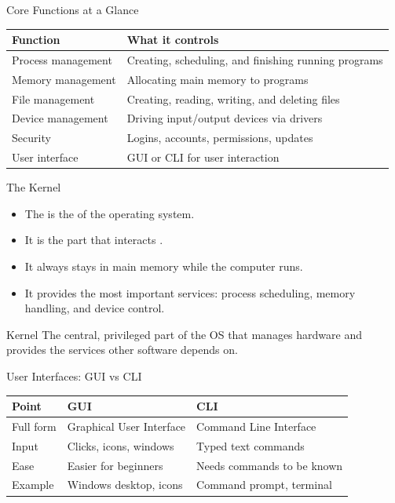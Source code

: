 \documentclass[aspectratio=169]{beamer}
\begin{document}
\begin{frame}{Core Functions at a Glance}
  \begin{center}
    \begin{tabular}{p{}p{}}
      \toprule
      \textbf{Function} & \textbf{What it controls} \\
      \midrule
      Process management & Creating, scheduling, and finishing running programs \\
      Memory management & Allocating main memory to programs \\
      File management & Creating, reading, writing, and deleting files \\
      Device management & Driving input/output devices via drivers \\
      Security & Logins, accounts, permissions, updates \\
      User interface & GUI or CLI for user interaction \\
      \bottomrule
    \end{tabular}
  \end{center}
\end{frame}

\begin{frame}{The Kernel}
  \begin{itemize}
    \item The  is the  of the operating system.
    \item It is the part that interacts .
    \item It always stays in main memory while the computer runs.
    \item It provides the most important services: process scheduling, memory
      handling, and device control.
  \end{itemize}
  \begin{block}{Kernel}
    The central, privileged part of the OS that manages hardware and provides
    the services other software depends on.
  \end{block}
\end{frame}

\begin{frame}{User Interfaces: GUI vs CLI}
  \begin{center}
    \begin{tabular}{p{}p{}p{}}
      \toprule
      \textbf{Point} & \textbf{GUI} & \textbf{CLI} \\
      \midrule
      Full form & Graphical User Interface & Command Line Interface \\
      Input & Clicks, icons, windows & Typed text commands \\
      Ease & Easier for beginners & Needs commands to be known \\
      Example & Windows desktop, icons & Command prompt, terminal \\
      \bottomrule
    \end{tabular}
  \end{center}
  \vspace{0.2cm}
\end{frame}
\end{document}
